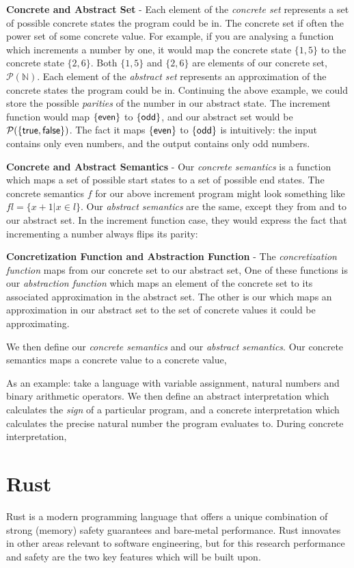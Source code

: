 \documentclass[12pt,twoside]{report}
\begin{document}
\textbf{Concrete and Abstract Set} - Each element of the \textit{concrete set} represents a set of possible concrete states the program could be in. The concrete set if often the power set of some concrete value. For example, if you are analysing a function which increments a number by one, it would map the concrete state $\{1, 5\}$ to the concrete state $\{2, 6\}$. Both $\{1, 5\}$ and $\{2, 6\}$ are  elements of our concrete set, $\mathcal{P}(\mathbb{N})$. Each element of the \textit{abstract set} represents an approximation of the concrete states the program could be in. Continuing the above example, we could store the possible \textit{parities} of the number in our abstract state. The increment function would map $\{ \mathsf{even} \}$ to $\{ \mathsf{odd} \}$, and our abstract set would be $\mathcal{P}({\{ \mathsf{true}, \mathsf{false} \}})$. The fact it maps $\{ \mathsf{even} \}$ to $\{ \mathsf{odd} \}$ is intuitively: the input contains only even numbers, and the output contains only odd numbers.

\textbf{Concrete and Abstract Semantics} - Our \textit{concrete semantics} is a function which maps a set of possible start states to a set of possible end states. The concrete semantics $f$ for our above increment program might look something like $f l = \{ x + 1 | x \in l \}$. Our \textit{abstract semantics} are the same, except they from and to our abstract set. In the increment function case, they would express the fact that incrementing a number always flips its parity: 

\textbf{Concretization Function and Abstraction Function} - The \textit{concretization function} maps from our concrete set to our abstract set, 
One of these functions is our \textit{abstraction function} which maps an element of the concrete set to its associated approximation in the abstract set. The other is our  which maps an approximation in our abstract set to the set of concrete values it could be approximating.

We then define our \textit{concrete semantics} and our \textit{abstract semantics}. Our concrete semantics maps a concrete value to a concrete value,

As an example: take a language with variable assignment, natural numbers and binary arithmetic operators. We then define an abstract interpretation which calculates the \textit{sign} of a particular program, and a concrete interpretation which calculates the precise natural number the program evaluates to. During concrete interpretation, 

\section{Rust}
Rust is a modern programming language that offers a unique combination of strong (memory) safety guarantees and bare-metal performance. Rust innovates in other areas relevant to software engineering, but for this research performance and safety are the two key features which will be built upon.
\end{document}
